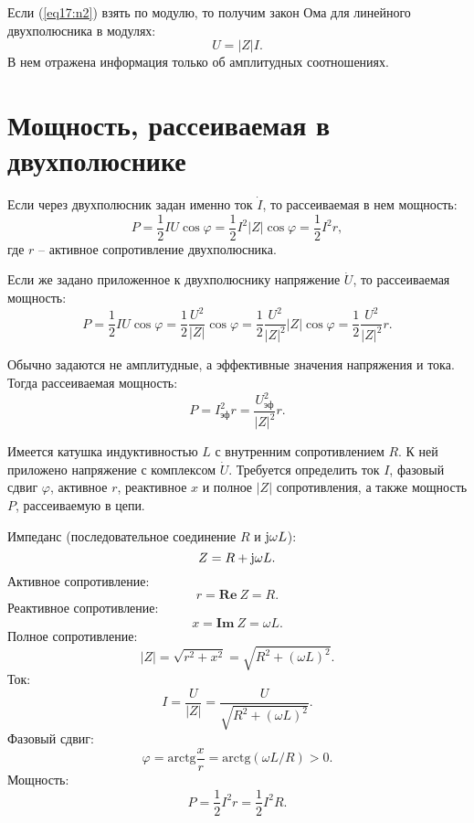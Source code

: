     
    
    \begin{remark}
        Если (\ref{eq17:n2}) взять по модулю, то получим закон Ома для линейного
        двухполюсника в модулях:
        \[
            U = |Z|I.
        \]
        В нем отражена информация только об амплитудных соотношениях.
    \end{remark}
    
\section{Мощность, рассеиваемая в двухполюснике}

    Если через двухполюсник задан именно ток \( \dot{I} \), то рассеиваемая в
    нем мощность:
    \[
        P = \frac{1}{2}IU\cos\varphi = \frac{1}{2}I^2|Z|\cos\varphi =
        \frac{1}{2}I^2r,
    \]
    где \( r \) -- активное сопротивление двухполюсника.
    
    Если же задано приложенное к двухполюснику напряжение  \( \dot{U} \), то
    рассеиваемая мощность:
    \[
        P = \frac{1}{2}IU\cos\varphi = \frac{1}{2}\frac{U^2}{|Z|}\cos\varphi =
        \frac{1}{2}\frac{U^2}{|Z|^2}|Z|\cos\varphi =
        \frac{1}{2}\frac{U^2}{|Z|^2}r.
    \]
    
    \begin{remark}
        Обычно задаются не амплитудные, а эффективные значения напряжения и
        тока. Тогда рассеиваемая мощность:
        \[
            P = I_{\textit{эф}}^2r = \frac{U_{\textit{эф}}^2}{|Z|^2}r.
        \]
    \end{remark}
    
    \begin{example}
        Имеется катушка индуктивностью \( L \) с внутренним сопротивлением
        \( R \). К ней приложено напряжение с комплексом \( \dot{U} \).
        Требуется определить ток \( I \), фазовый сдвиг \( \varphi \), активное
         \( r \), реактивное \( x \) и полное \( |Z| \) сопротивления, а также
          мощность \( P \), рассеиваемую в цепи.
    \end{example}

    \begin{solution}
        Импеданс (последовательное соединение \( R \) и \( \mathrm{j}\omega L \)):
        \[
            Z = R + \mathrm{j}\omega L.
        \]
        Активное сопротивление:
        \[
            r = \mathbf{Re\ }Z = R.
        \]        
        Реактивное сопротивление:
        \[
            x = \mathbf{Im\ }Z = \omega L.
        \]
        Полное сопротивление:
        \[
            |Z| = \sqrt{r^2 + x^2} = \sqrt{R^2 + (\omega L)^2}.
        \]
        Ток:
        \[
            I = \frac{U}{|Z|} = \frac{U}{\sqrt{R^2 + (\omega L)^2}}.
        \]
        Фазовый сдвиг:
        \[
            \varphi = \mathrm{arctg}\frac{x}{r} =
            \mathrm{arctg}(\omega L/R) > 0.
        \]
        Мощность:
        \[
            P = \frac{1}{2}I^2r = \frac{1}{2}I^2R.
        \]
    \end{solution}
    
